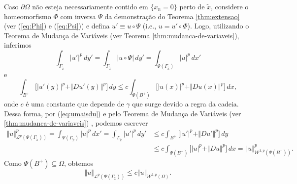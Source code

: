 \documentclass[a4paper, 11pt]{book}
\theoremstyle{definition}
\newcommand{\cL}{\mathcal{L}}
\newcommand{\cW}{\mathcal{W}}
\begin{document}
\begin{prf}
\begin{figure}
        \caption{}
        \label{fig:tracos}
    \end{figure}

    Caso $\partial \Omega$ não esteja necessariamente contido em $\{x_n =0 \}$ perto de $\tilde x$, considere o homeomorfismo $\Phi$  com inversa $\Psi$ da demonstração do Teorema \ref{thm:extensao} (ver (\ref{eq:Phi}) e (\ref{eq:Psi})) e defina $u' \equiv u \circ \Psi$ (i.e., $u = u' \circ \Phi$). Logo, utilizando o Teorema de Mudança de Variáveis (ver Teorema \ref{thm:mudanca-de-variaveis}), inferimos
    \[
        \int_{\Gamma_{\tilde x}} |u'|^p \,dy' = \int_{\Gamma_{\tilde x}} |u \circ \Psi| \, dy' = \int_{\Psi(\Gamma_{\tilde x})} |u|^p \,dx'
    \]
    e
    \[
        \int_{B^+} \big[ |u'(y)|^p + \Vert Du'(y) \Vert^p \big] \,dy \leqslant c\int_{\Psi(B^+)} \big[ |u(x)|^p + \Vert Du(x) \Vert^p \big] \,dx,
    \]
    onde $c$ é uma constante que depende de $\gamma$ que surge devido a regra da cadeia. Dessa forma, por (\ref{eq:umaisdu}) e pelo Teorema de Mudança de Variáveis (ver \ref{thm:mudanca-de-variaveis}) , podemos escrever
    \[
        \begin{aligned}
            \Vert u \Vert^p_{\cL^p(\Psi(\Gamma_{\tilde x}))} = \int_{\Psi(\Gamma_{\tilde x})} |u|^p \,dx' = \int_{\Gamma_{\tilde x}} |u'|^p \,dy' &\leqslant c\int_{B^+} \big[ |u'|^p + \Vert Du' \Vert^p \big]\,dy\\ 
            &\leqslant c \int_{\Psi(B^+)} \big[ |u|^p + \Vert Du \Vert^p \big] \,dx = \Vert u \Vert_{\cW^{1,p}(\Psi(B^+))}^p.
        \end{aligned}
    \]
    Como $\Psi(B^+) \subseteq \Omega$, obtemos 
    \[
        \Vert u \Vert_{\cL^p(\Psi(\Gamma_{\tilde x}))} \leqslant c \Vert u \Vert_{\cW^{1,p}(\Omega)}.
    \]


\end{prf}
\end{document}
